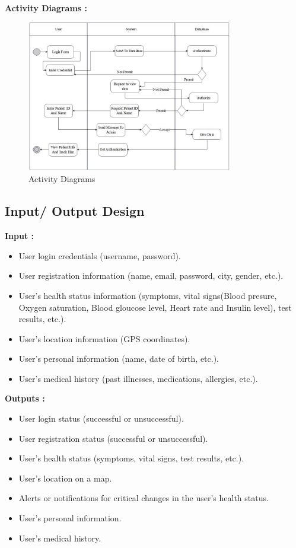 \documentclass[12pt]{article}
\begin{document}
			\textbf{Activity Diagrams :}
			\begin{figure}[!h]
				\centering
				\includegraphics[width=0.8\textwidth]{Activity.jpg}
				\caption{Activity Diagrams}
				\label{Activity Diagrams}
			\end{figure}
			\subsection{Input/ Output Design}
			\textbf{Input :}
			\begin{itemize}
				\item User login credentials (username, password).
				\item User registration information (name, email, password, city, gender, etc.).
				\item User's health status information (symptoms, vital signs(Blood presure, Oxygen saturation, Blood gloucose level, Heart rate and Insulin level), test results, etc.).
				\item User's location information (GPS coordinates).
				\item User's personal information (name, date of birth, etc.).
				\item User's medical history (past illnesses, medications, allergies, etc.).
				
			\end{itemize}
			\textbf{Outputs :}
			\begin{itemize}
				\item User login status (successful or unsuccessful).
				\item User registration status (successful or unsuccessful).
				\item User's health status (symptoms, vital signs, test results, etc.).
				\item User's location on a map.
				\item Alerts or notifications for critical changes in the user's health status.
				\item User's personal information.
				\item User's medical history.
				
			\end{itemize}
\end{document}
